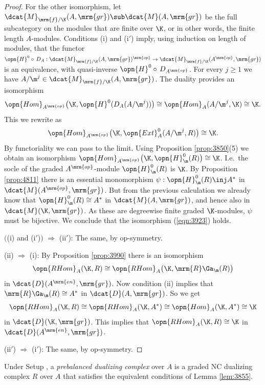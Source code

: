 \begin{proof}
For the other isomorphism, let 
$\dcat{M}_{\mrm{f}/ \K}(A, \mrm{gr}) \sub \dcat{M}(A, \mrm{gr})$
be the full subcategory on the modules that are finite over $\K$, or in other 
words, the finite length $A$-modules. Conditions (i) and (i$'$) imply, using 
induction on length of modules, that the functor 
$\opn{H}^0 \circ \, D_A : \dcat{M}_{\mrm{f}/ \K}(A, \mrm{gr})^{\mrm{op}} \to
\dcat{M}_{\mrm{f}/ \K}(A^{\mrm{op}}, \mrm{gr})$
is an equivalence, with quasi-inverse $\opn{H}^0 \circ \, D_{A^{\mrm{op}}}$. 
For every $j \geq 1$ we have 
$A / \m^j \in \dcat{M}_{\mrm{f}/ \K}(A, \mrm{gr})$. 
The duality provides an isomorphism 
\[ \opn{Hom}_{A^{\mrm{op}}} 
\bigl( \K, \opn{H}^0(D_{A}(A / \m^j)) \bigr)
\cong \opn{Hom}_{A} (A / \m^j, \K) \cong \K . \]
This we rewrite as 
\[ \opn{Hom}_{A^{\mrm{op}}} 
\bigl( \K, \opn{Ext}^0_A(A / \m^j, R) \bigr) \cong \K . \]
By functoriality we can pass to the limit. Using Proposition \ref{prop:3850}(5)
we obtain an isomorphism 
$\opn{Hom}_{A^{\mrm{op}}} \bigl( \K, \opn{H}^0_{\m}(R) \bigr) \cong \K$.
I.e.\ the socle of the graded $A^{\mrm{op}}$-module 
$\opn{H}^0_{\m}(R)$ is $\K$. 
By Proposition \ref{prop:4811} there is an essential 
monomorphism 
$\psi : \opn{H}^0_{\m}(R) \inj A^*$
in $\dcat{M}(A^{\mrm{op}}, \mrm{gr})$. 
But from the previous calculation we already know that 
$\opn{H}^0_{\m}(R) \cong A^*$ in $\dcat{M}(A, \mrm{gr})$, and hence also in 
$\dcat{M}(\K, \mrm{gr})$. As these are degreewise finite graded $\K$-modules,
$\psi$ must be bijective. 
We conclude that the isomorphism (\ref{eqn:3923}) holds.

\medskip \noindent 
$\bigl($(i) and (i$'$)$\bigr)$ $\Rightarrow$ (ii$'$): 
The same, by op-symmetry.

\medskip \noindent 
(ii) $\Rightarrow$ (i): 
By Proposition \ref{prop:3990} there is an isomorphism 
\[ \opn{RHom}_A(\K, R) \cong
\opn{RHom}_A \bigl( \K, \mrm{R} \Ga_{\m}(R) \bigr)  \]
in $\dcat{D}(A^{\mrm{en}}, \mrm{gr})$. 
Now condition (ii) implies that 
$\mrm{R} \Ga_{\m}(R) \cong A^*$
in $\dcat{D}(A, \mrm{gr})$. So we get 
\[ \opn{RHom}_A(\K, R) \cong \opn{RHom}_A(\K, A^*) 
\cong \opn{Hom}_A(\K, A^*) \cong \K \]
in $\dcat{D}(\K, \mrm{gr})$.
This implies that  
$\opn{RHom}_A(\K, R) \cong \K$
in $\dcat{D}(A^{\mrm{en}}, \mrm{gr})$.

\medskip \noindent 
(ii$'$) $\Rightarrow$ (i$'$): The same, by op-symmetry. 
\end{proof}

\begin{dfn}[\cite{Ye1}] \label{dfn:3781} 
Under Setup \tup{\ref{setup:3925}}, a {\em prebalanced dualizing complex} over 
$A$ is a graded NC dualizing complex $R$ over $A$
that satisfies the equivalent conditions of Lemma \ref{lem:3855}.
\end{dfn}

